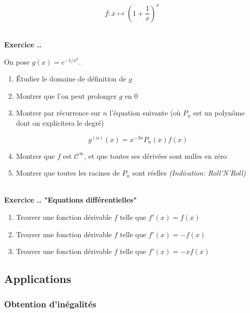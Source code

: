 \documentclass{article}
\newcounter{exo}
\newcommand{\exercice}[1][\null]{\textbf{\\ Exercice \thesection.\theexo. #1} \addtocounter{exo}{1}}
\begin{document}
\begin{equation*}
    f : x \mapsto \left(1 + \frac{1}{x}\right)^x
\end{equation*}

\exercice

On pose $g(x) = e^{-1/x^2}$.

\begin{enumerate}
    \item Étudier le domaine de définition de $g$
    \item Montrer que l'on peut prolonger $g$ en $0$
    \item Montrer par récurrence sur $n$ l'équation suivante 
        (où $P_n$ est un polynôme dont on explicitera 
        le degré)

        \begin{equation*}
            g^{(n)} (x) = x^{-3n} P_n (x) f(x) 
        \end{equation*}

    \item Montrer que $f$ est $\mathcal{C}^\infty$, 
        et que toutes ses dérivées sont nulles en zéro

    \item Montrer que toutes les racines de $P_n$ sont 
        réelles \emph{(Indication: Roll'N'Roll)}
\end{enumerate}



\exercice["Equations différentielles"]

\begin{enumerate}
    \item Trouver une fonction dérivable $f$ telle que $f'(x) = f(x)$
    \item Trouver une fonction dérivable $f$ telle que 
        $f'(x) = - f (x)$
    \item Trouver une fonction dérivable $f$ telle que 
        $f'(x) = -x f(x)$
\end{enumerate}




\subsection{Applications}


\subsubsection{Obtention d'inégalités}
\end{document}
